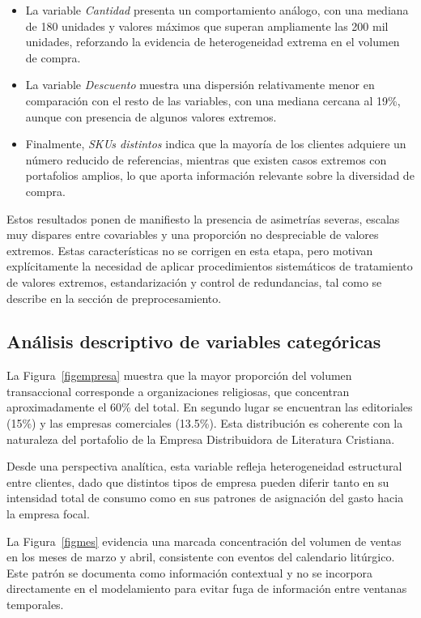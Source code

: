 \begin{itemize}
    \item La variable \textit{Cantidad} presenta un comportamiento análogo, con una mediana de 180 unidades y valores máximos que superan ampliamente las 200 mil unidades, reforzando la evidencia de heterogeneidad extrema en el volumen de compra.
    
    \item La variable \textit{Descuento} muestra una dispersión relativamente menor en comparación con el resto de las variables, con una mediana cercana al 19\%, aunque con presencia de algunos valores extremos.
    
    \item Finalmente, \textit{SKUs distintos} indica que la mayoría de los clientes adquiere un número reducido de referencias, mientras que existen casos extremos con portafolios amplios, lo que aporta información relevante sobre la diversidad de compra.
    \end{itemize}
    
    Estos resultados ponen de manifiesto la presencia de asimetrías severas, escalas muy dispares entre covariables y una proporción no despreciable de valores extremos. Estas características no se corrigen en esta etapa, pero motivan explícitamente la necesidad de aplicar procedimientos sistemáticos de tratamiento de valores extremos, estandarización y control de redundancias, tal como se describe en la sección de preprocesamiento.
    
    \subsection{Análisis descriptivo de variables categóricas}
    
    La Figura~\ref{figempresa} muestra que la mayor proporción del volumen transaccional corresponde a organizaciones religiosas, que concentran aproximadamente el 60\% del total. En segundo lugar se encuentran las editoriales (15\%) y las empresas comerciales (13.5\%). Esta distribución es coherente con la naturaleza del portafolio de la Empresa Distribuidora de Literatura Cristiana.
    
    Desde una perspectiva analítica, esta variable refleja heterogeneidad estructural entre clientes, dado que distintos tipos de empresa pueden diferir tanto en su intensidad total de consumo como en sus patrones de asignación del gasto hacia la empresa focal.

    La Figura~\ref{figmes} evidencia una marcada concentración del volumen de ventas en los meses de marzo y abril, consistente con eventos del calendario litúrgico. Este patrón se documenta como información contextual y no se incorpora directamente en el modelamiento para evitar fuga de información entre ventanas temporales.
    

